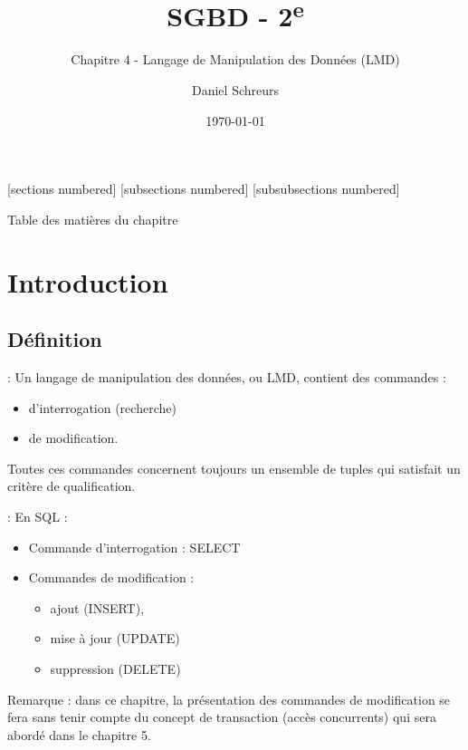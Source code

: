 \documentclass[10pt]{beamer}
\title{SGBD - 2\textsuperscript{e}}
\subtitle{Chapitre 4 - Langage de Manipulation des Données (LMD)}
\date{\today}
\author{Daniel Schreurs}
\institute{Haute École de la Province de Liège}
\begin{document}
\maketitle


[sections numbered]
[subsections numbered]
[subsubsections numbered]
\begin{frame}[allowframebreaks]{Table des matières du chapitre}
    \tableofcontents[subsectionstyle=show/show/hide,subsubsectionstyle=show/show/hide,]
\end{frame}


\section{Introduction}
\tocss
\subsection{Définition}
\begin{frame}{\secname : \subsecname}
    Un langage de manipulation des données, ou LMD, contient des commandes :
    \begin{itemize}
        \item d'interrogation (recherche)
        \item de modification.
    \end{itemize}
    Toutes ces commandes concernent toujours un ensemble de tuples qui satisfait un critère de qualification.
\end{frame}

\begin{frame}{\secname : \subsecname}
    En SQL :
    \begin{itemize}
        \item Commande d'interrogation : SELECT
        \item Commandes de modification :
              \begin{itemize}
                  \item ajout (INSERT),
                  \item mise à jour (UPDATE)
                  \item suppression (DELETE)
              \end{itemize}
    \end{itemize}
    Remarque : dans ce chapitre, la présentation des commandes de modification se fera sans tenir compte du concept de transaction (accès concurrents) qui sera abordé dans le chapitre 5.
\end{frame}
\end{document}
